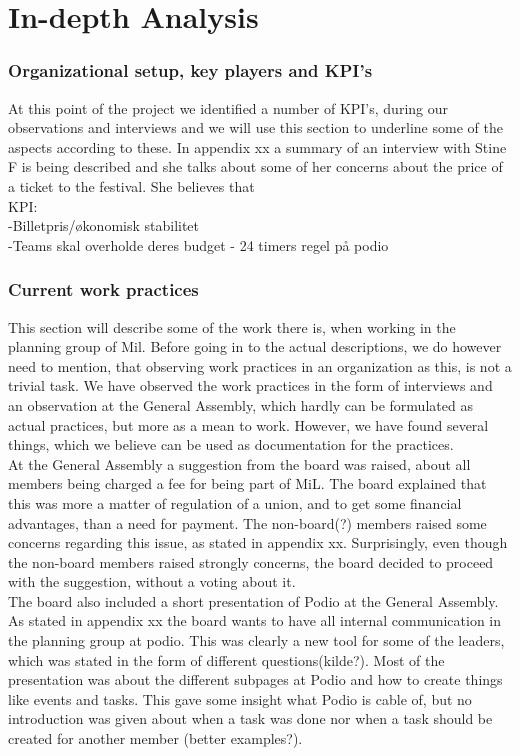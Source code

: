 \part{In-depth Analysis}

\section{Organizational setup, key players and KPI's}
At this point of the project we identified a number of KPI's, during our observations and interviews and we will use this section to underline some of the aspects according to these.
In appendix xx a summary of an interview with Stine F is being described and she talks about some of her concerns about the price of a ticket to the festival. She believes that \\
KPI:\\
-Billetpris/økonomisk stabilitet\\
-Teams skal overholde deres budget
- 24 timers regel på podio
\section{Current work practices}
This section will describe some of the work there is, when working in the planning group of Mil. Before going in to the actual descriptions, we do however need to mention, that observing work practices in an organization as this, is not a trivial task. We have observed the work practices in the form of interviews and an observation at the General Assembly, which hardly can be formulated as actual practices, but more as a mean to work. However, we have found several things, which we believe can be used as documentation for the practices. \\
At the General Assembly a suggestion from the board was raised, about all members being charged a fee for being part of MiL. The board explained that this was more a matter of regulation of a union, and to get some financial advantages, than a need for payment. The non-board(?) members raised some concerns regarding this issue, as stated in appendix xx. Surprisingly, even though the non-board members raised strongly concerns, the board decided to proceed with the suggestion, without a voting about it. \\
The board also included a short presentation of Podio at the General Assembly. As stated in appendix xx the board wants to have all internal communication in the planning group at podio. This was clearly a new tool for some of the leaders, which was stated in the form of different questions(kilde?). Most of the presentation was about the different subpages at Podio and how to create things like events and tasks. This gave some insight what Podio is cable of, but no introduction was given about when a task was done nor when a task should be created for another member (better examples?). \\
 
